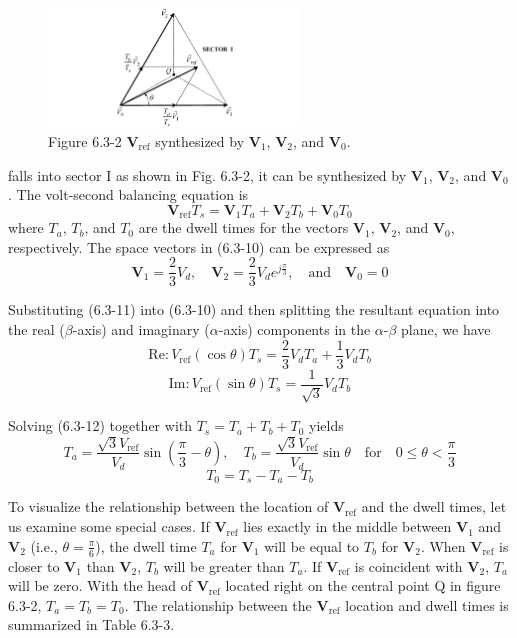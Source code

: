 \documentclass[letterpaper,12pt]{article}
\begin{document}
\begin{figure}[h]
    \centering
    \includegraphics[width=0.6\textwidth]{graficos/img113.jpg}
    \caption{Figure 6.3-2 $\mathbf{V}_{\text{ref}}$ synthesized by $\mathbf{V}_1$, $\mathbf{V}_2$, and $\mathbf{V}_0$.}
    \label{fig:space_vector_synthesis}
\end{figure}
\FloatBarrier

falls into sector I as shown in Fig. 6.3-2, it can be synthesized by \( \mathbf{V}_1 \), \( \mathbf{V}_2 \), and \( \mathbf{V}_0 \). The volt-second balancing equation is
\[
\mathbf{V}_{\text{ref}} T_s = \mathbf{V}_1 T_a + \mathbf{V}_2 T_b + \mathbf{V}_0 T_0 \tag{6.3-10}
\]
where \( T_a \), \( T_b \), and \( T_0 \) are the dwell times for the vectors \( \mathbf{V}_1 \), \( \mathbf{V}_2 \), and \( \mathbf{V}_0 \), respectively. The space vectors in (6.3-10) can be expressed as
\[
\mathbf{V}_1 = \frac{2}{3} V_d, \quad \mathbf{V}_2 = \frac{2}{3} V_d e^{j\frac{\pi}{3}}, \quad \text{and} \quad \mathbf{V}_0 = 0 \tag{6.3-11}
\]

Substituting (6.3-11) into (6.3-10) and then splitting the resultant equation into the real (\(\beta\)-axis) and imaginary (\(\alpha\)-axis) components in the \(\alpha\)-\(\beta\) plane, we have
\[
\text{Re}: V_{\text{ref}}(\cos \theta) T_s = \frac{2}{3} V_d T_a + \frac{1}{3} V_d T_b \tag{6.3-12}
\]
\[
\text{Im}: V_{\text{ref}}(\sin \theta) T_s = \frac{1}{\sqrt{3}} V_d T_b
\]

Solving (6.3-12) together with \( T_s = T_a + T_b + T_0 \) yields
\[
T_a = \frac{\sqrt{3} V_{\text{ref}}}{V_d} \sin\left(\frac{\pi}{3} - \theta\right), \quad T_b = \frac{\sqrt{3} V_{\text{ref}}}{V_d} \sin \theta \quad \text{for} \quad 0 \leq \theta < \frac{\pi}{3} \tag{6.3-13}
\]
\[
T_0 = T_s - T_a - T_b
\]

To visualize the relationship between the location of \( \mathbf{V}_{\text{ref}} \) and the dwell times, let us examine some special cases. If \( \mathbf{V}_{\text{ref}} \) lies exactly in the middle between \( \mathbf{V}_1 \) and \( \mathbf{V}_2 \) (i.e., \(\theta = \frac{\pi}{6}\)), the dwell time \( T_a \) for \( \mathbf{V}_1 \) will be equal to \( T_b \) for \( \mathbf{V}_2 \). When \( \mathbf{V}_{\text{ref}} \) is closer to \( \mathbf{V}_1 \) than \( \mathbf{V}_2 \), \( T_b \) will be greater than \( T_a \). If \( \mathbf{V}_{\text{ref}} \) is coincident with \( \mathbf{V}_2 \), \( T_a \) will be zero. With the head of \( \mathbf{V}_{\text{ref}} \) located right on the central point Q in figure 6.3-2, \( T_a = T_b = T_0 \). The relationship between the \( \mathbf{V}_{\text{ref}} \) location and dwell times is summarized in Table 6.3-3.
\end{document}
